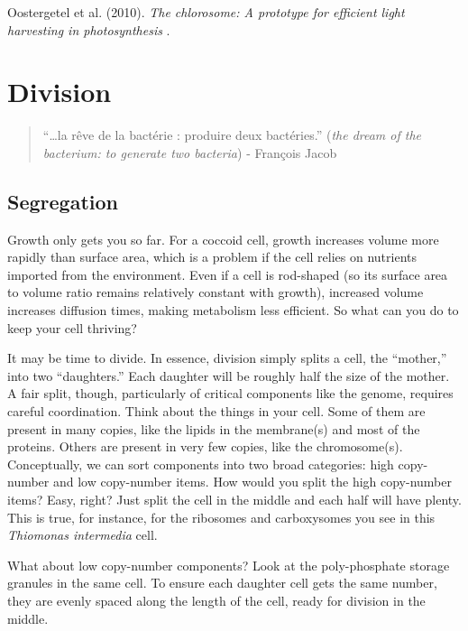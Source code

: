 \documentclass[]{tufte-book}
\begin{document}
Oostergetel et al. (2010). \emph{The chlorosome: A prototype for
efficient light harvesting in photosynthesis} \citep{oostergetel2010}.

\chapter{Division}\label{division}

\begin{quote}
``\ldots{}la rêve de la bactérie : produire deux bactéries.'' (\emph{the
dream of the bacterium: to generate two bacteria}) - François Jacob
\citep{jacob2002a}
\end{quote}

\section{Segregation}\label{segregation}

Growth only gets you so far. For a coccoid cell, growth increases volume
more rapidly than surface area, which is a problem if the cell relies on
nutrients imported from the environment. Even if a cell is rod-shaped
(so its surface area to volume ratio remains relatively constant with
growth), increased volume increases diffusion times, making metabolism
less efficient. So what can you do to keep your cell thriving?

It may be time to divide. In essence, division simply splits a cell, the
``mother,'' into two ``daughters.'' Each daughter will be roughly half
the size of the mother. A fair split, though, particularly of critical
components like the genome, requires careful coordination. Think about
the things in your cell. Some of them are present in many copies, like
the lipids in the membrane(s) and most of the proteins. Others are
present in very few copies, like the chromosome(s). Conceptually, we can
sort components into two broad categories: high copy-number and low
copy-number items. How would you split the high copy-number items? Easy,
right? Just split the cell in the middle and each half will have plenty.
This is true, for instance, for the ribosomes and carboxysomes you see
in this \emph{Thiomonas intermedia} cell.

What about low copy-number components? Look at the poly-phosphate
storage granules in the same cell. To ensure each daughter cell gets the
same number, they are evenly spaced along the length of the cell, ready
for division in the middle.
\end{document}
